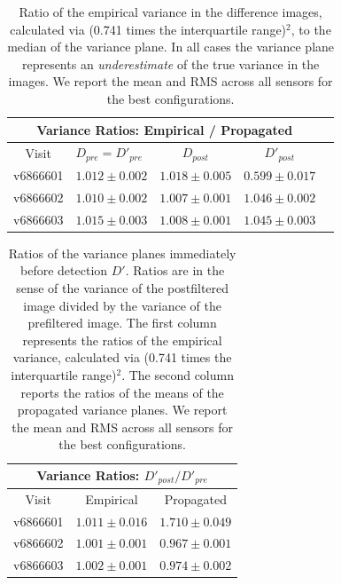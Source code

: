 \documentclass[prd, nofootinbib, floatfix, 11pt,tightenlines,times]{article}
\begin{document}
\clearpage

\begin{table}
\centering
\begin{tabular}{clccc}
\hline
\multicolumn{4}{|c|}{Variance Ratios: Empirical / Propagated} \\
\hline
Visit    & $D_{pre} = D'_{pre}$ & $D_{post}$ & $D'_{post}$ \\
\hline
v6866601 &$1.012 \pm 0.002$&$1.018 \pm 0.005$&$0.599 \pm 0.017$ \\
v6866602 &$1.010 \pm 0.002$&$1.007 \pm 0.001$&$1.046 \pm 0.002$ \\
v6866603 &$1.015 \pm 0.003$&$1.008 \pm 0.001$&$1.045 \pm 0.003$ \\
\end{tabular}
\caption{Ratio of the empirical variance in the difference images,
  calculated via (0.741 times the interquartile range)$^2$, to the
  median of the variance plane.  In all cases the variance plane
  represents an {\it underestimate} of the true variance in the
  images.  We report the mean and RMS across all sensors for the best
  configurations.  }
\label{tab-variance1}
\end{table}

\begin{table}
\centering
\begin{tabular}{ccc}
\hline
\multicolumn{3}{|c|}{Variance Ratios: $D'_{post} / D'_{pre}$} \\
\hline
Visit    & Empirical & Propagated \\
\hline
v6866601 & $1.011 \pm 0.016$    & $1.710 \pm 0.049$    \\
v6866602 & $1.001 \pm 0.001$    & $0.967 \pm 0.001$    \\
v6866603 & $1.002 \pm 0.001$    & $0.974 \pm 0.002$    \\
\end{tabular}
\caption{Ratios of the variance planes immediately before detection
  $D'$.  Ratios are in the sense of the variance of the postfiltered
  image divided by the variance of the prefiltered image.  The first
  column represents the ratios of the empirical variance, calculated
  via (0.741 times the interquartile range)$^2$.  The second column
  reports the ratios of the means of the propagated variance planes.
  We report the mean and RMS across all sensors for the best
  configurations.}
\label{tab-variance2}
\end{table}
\end{document}

